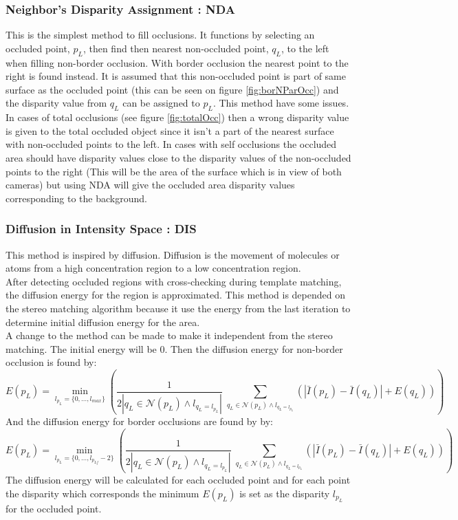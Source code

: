 \subsubsection{Neighbor's Disparity Assignment : NDA}
This is the simplest method to fill occlusions. It functions by selecting an occluded point, $p_L$, then find then nearest non-occluded point, $q_L$, to the left when filling non-border occlusion. With border occlusion the nearest point to the right is found instead. It is assumed that this non-occluded point is part of same surface as the occluded point (this can be seen on figure \ref{fig:borNParOcc}) and the disparity value from $q_L$ can be assigned to $p_L$. This method have some issues. In cases of total occlusions (see figure \ref{fig:totalOcc}) then a wrong disparity value is given to the total occluded object since it isn't a part of the nearest surface with non-occluded points to the left. In cases with self occlusions the occluded area should have disparity values close to the disparity values of the non-occluded points to the right (This will be the area of the surface which is in view of both cameras) but using NDA will give the occluded area disparity values corresponding to the background. 

\subsubsection{Diffusion in Intensity Space : DIS}
This method is inspired by diffusion. Diffusion is the movement of molecules or atoms from a high concentration region to a low concentration region. \\
After detecting occluded regions with cross-checking during template matching, the diffusion energy for the region is approximated. This method is depended on the stereo matching algorithm because it use the energy from the last iteration to determine initial diffusion energy for the area. \\
A change to the method can be made to make it independent from the stereo matching. The initial energy will be 0. Then the diffusion energy for non-border occlusion is found by:
\begin{equation}
E(p_L) = \min_{l_{p_L}=\{0,\dots, l_{max}\}} \left( \dfrac{1}{2 | q_L \in \mathcal{N}(p_L) \wedge l_{q_L=l_{p_L}} |} \; \sum_{q_L \in \mathcal{N}(p_L) \wedge l_{q_L = l_{p_L}}} (|\bar{I}(p_L)-\bar{I}(q_L) | + E(q_L))\right)
\end{equation}
And the diffusion energy for border occlusions are found by by:
\begin{equation}
E(p_L) = \min_{l_{p_L}=\{0,\dots, l_{p_{Lf}}-2\}} \left( \dfrac{1}{2 | q_L \in \mathcal{N}(p_L) \wedge l_{q_L=l_{p_L}} |} \; \sum_{q_L \in \mathcal{N}(p_L) \wedge l_{q_L = l_{p_L}}} (|\bar{I}(p_L)-\bar{I}(q_L) | + E(q_L))\right)
\end{equation}
The diffusion energy will be calculated for each occluded point and for each point the disparity which corresponds the minimum $E(p_L)$ is set as the disparity $l_{p_L}$ for the occluded point. 


